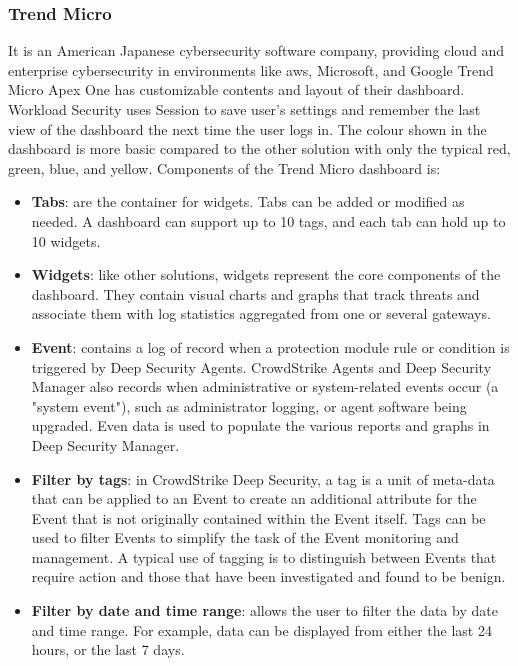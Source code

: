\begin{multicols}{2}

      \subsubsection{Trend Micro} %
      It is an American Japanese cybersecurity software company, providing cloud and enterprise cybersecurity in
      environments like \acrshort{aws}, Microsoft, and Google Trend Micro Apex One has customizable contents and
      layout of their dashboard. Workload Security uses Session to save user's settings and remember the last view
      of the dashboard the next time the user logs in. The colour shown in the dashboard is more basic compared to
      the other solution with only the typical red, green, blue, and yellow. Components of the
      Trend Micro dashboard is:

      \begin{itemize}
            \item \textbf{Tabs}: are the container for widgets. Tabs can be added or modified as needed. A dashboard
                  can support up to 10 tags, and each tab can hold up to 10 widgets.
            \item \textbf{Widgets}: like other solutions, widgets represent the core components of the dashboard.
                  They contain visual charts and graphs that track threats and associate them with log statistics
                  aggregated from one or several gateways.
            \item \textbf{Event}: contains a log of record when a protection module rule or condition is triggered
                  by Deep Security Agents. CrowdStrike Agents and Deep Security Manager also records when
                  administrative or system-related events occur (a "system event"), such as administrator logging,
                  or agent software being upgraded. Even data is used to populate the various reports and graphs
                  in Deep Security Manager.
            \item \textbf{Filter by tags}: in CrowdStrike Deep Security\textregistered, a tag is a unit of meta-data
                  that can be applied to an Event to create an additional attribute for the Event that is not
                  originally contained within the Event itself. Tags can be used to filter Events to simplify
                  the task of the Event monitoring and management. A typical use of tagging is to distinguish between
                  Events that require action and those that have been investigated and found to be benign.
            \item \textbf{Filter by date and time range}: allows the user to filter the data by date and time range.
                  For example, data can be displayed from either the last 24 hours, or the last 7 days.
      \end{itemize}


\end{multicols}
